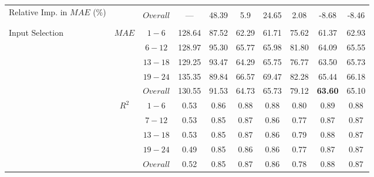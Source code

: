\begin{table}[h]
\begin{center}
\begin{tabular}{@{}p{5.3em}ccccccccc@{}}
    \midrule
    \multirow{3}{5em}{Relative Imp. in $MAE$ (\%)} & & & & & & & & & \\
    & & $Overall$ & --- & 48.39 & 5.9 & 24.65 & 2.08 & -8.68 & -8.46 \\ 
    & & & & & & & & & \\ 
    \midrule
    \multirow{10}{5em}{Input Selection}
                                              & \multirow{5}{*}{$MAE$} & $1 - 6$ & 128.64 & 87.52 & 62.29 & 61.71 & 75.62 & 61.37 & 62.93 \\
                                              &                   & $6 - 12$ & 128.97 & 95.30 & 65.77 & 65.98 & 81.80 & 64.09 & 65.55 \\
                                              &                   & $13 - 18$ & 129.25 & 93.47 & 64.29 & 65.75 & 76.77 & 63.50 & 65.73 \\
                                              &                   & $19 - 24$ & 135.35 & 89.84 & 66.57 & 69.47 & 82.28 & 65.44 & 66.18 \\
                                              &                   & $Overall$ & 130.55 & 91.53 & 64.73 & 65.73 & 79.12 & \textbf{63.60} & 65.10 \\ \cmidrule(lr){2-10}
                                              & \multirow{5}{*}{$R^2$} & $1 - 6$ & 0.53 & 0.86 & 0.88 & 0.88 & 0.80 & 0.89 & 0.88 \\
                                              &                   & $7 - 12$ & 0.53 & 0.85 & 0.87 & 0.86 & 0.77 & 0.87 & 0.87 \\
                                              &                   & $13 - 18$ & 0.53 & 0.85 & 0.87 & 0.86 & 0.79 & 0.88 & 0.87 \\
                                              &                   & $19 - 24$ & 0.49 & 0.85 & 0.86 & 0.86 & 0.77 & 0.87 & 0.87 \\
                                              &                   & $Overall$ & 0.52 & 0.85 & 0.87 & 0.86 & 0.78 & 0.88 & 0.87 \\ 
    \bottomrule
    \end{tabular}
\end{center}
\end{table}

